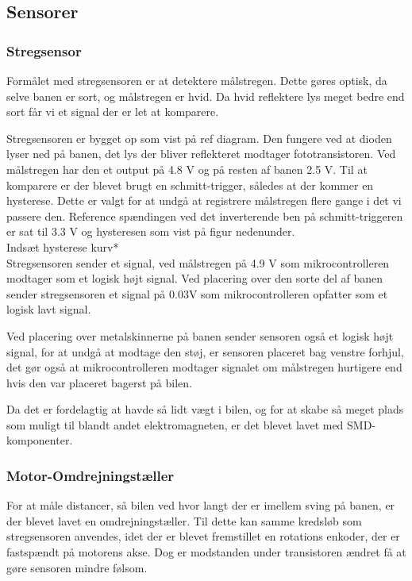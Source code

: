 
\subsection{Sensorer}


\subsubsection{Stregsensor}
Formålet med stregsensoren er at detektere målstregen. Dette gøres optisk, da selve banen er sort, og målstregen er hvid. Da hvid reflektere lys meget bedre end sort får vi et signal der er let at komparere.

Stregsensoren er bygget op som vist på ref diagram. Den fungere ved at dioden lyser ned på banen, det lys der bliver reflekteret modtager fototransistoren. Ved målstregen har den et output på 4.8 V og på resten af banen 2.5 V. Til at komparere er der blevet brugt en schmitt-trigger, således at der kommer en hysterese. Dette er valgt for at undgå at registrere målstregen flere gange i det vi passere den. Reference spændingen ved det inverterende ben på schmitt-triggeren er sat til 3.3 V og hysteresen som vist på figur nedenunder.
\\
Indsæt hysterese kurv*
\\
Stregsensoren sender et signal, ved målstregen på 4.9 V som  mikrocontrolleren modtager som et logisk højt signal. Ved placering over den sorte del af banen sender stregsensoren et signal på 0.03V som mikrocontrolleren opfatter som et logisk lavt signal.

Ved placering over metalskinnerne på banen sender sensoren også et logisk højt signal, for at undgå at modtage den støj, er sensoren placeret bag venstre forhjul, det gør også at mikrocontrolleren modtager signalet om målstregen hurtigere end hvis den var placeret bagerst på bilen.

Da det er fordelagtig at havde så lidt vægt i bilen, og for at skabe så meget plads som muligt til blandt andet elektromagneten, er det blevet lavet med SMD-komponenter.


\subsubsection{Motor-Omdrejningstæller}
\label{motor-omdrej}

For at måle distancer, så bilen ved hvor langt der er imellem sving på banen, er der blevet lavet en omdrejningstæller. Til dette kan samme kredsløb som stregsensoren anvendes, idet der er blevet fremstillet en rotations enkoder, der er fastspændt på motorens akse. Dog er modstanden under transistoren ændret få at gøre sensoren mindre følsom.


